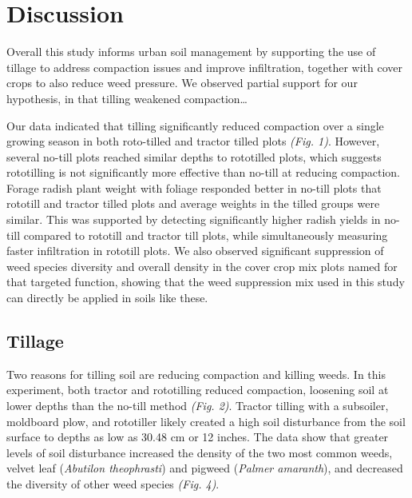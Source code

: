 \documentclass[
]{article}
\begin{document}
\hypertarget{discussion}{%
\section{Discussion}\label{discussion}}

Overall this study informs urban soil management by supporting the use of tillage to address compaction issues and improve infiltration, together with cover crops to also reduce weed pressure.
We observed partial support for our hypothesis, in that tilling weakened compaction\ldots{}

Our data indicated that tilling significantly reduced compaction over a single growing season in both roto-tilled and tractor tilled plots \emph{(Fig. 1)}.
However, several no-till plots reached similar depths to rototilled plots, which suggests rototilling is not significantly more effective than no-till at reducing compaction.
Forage radish plant weight with foliage responded better in no-till plots that rototill and tractor tilled plots and average weights in the tilled groups were similar.
This was supported by detecting significantly higher radish yields in no-till compared to rototill and tractor till plots, while simultaneously measuring faster infiltration in rototill plots.
We also observed significant suppression of weed species diversity and overall density in the cover crop mix plots named for that targeted function, showing that the weed suppression mix used in this study can directly be applied in soils like these.

\hypertarget{tillage-1}{%
\subsection{Tillage}\label{tillage-1}}

Two reasons for tilling soil are reducing compaction and killing weeds.
In this experiment, both tractor and rototilling reduced compaction, loosening soil at lower depths than the no-till method \emph{(Fig. 2)}.
Tractor tilling with a subsoiler, moldboard plow, and rototiller likely created a high soil disturbance from the soil surface to depths as low as 30.48 cm or 12 inches.
The data show that greater levels of soil disturbance increased the density of the two most common weeds, velvet leaf (\emph{Abutilon theophrasti}) and pigweed (\emph{Palmer amaranth}), and decreased the diversity of other weed species \emph{(Fig. 4)}.

\hfill\break
\end{document}
